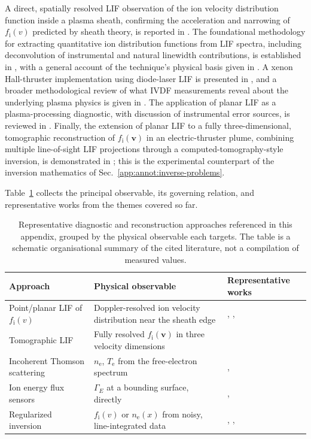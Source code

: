 A direct, spatially resolved LIF observation of the ion velocity distribution function inside a plasma sheath, confirming the acceleration and narrowing of $f_{\mathrm{i}}(v)$ predicted by sheath theory, is reported in \cite{ref0329}. The foundational methodology for extracting quantitative ion distribution functions from LIF spectra, including deconvolution of instrumental and natural linewidth contributions, is established in \cite{ref0338}, with a general account of the technique's physical basis given in \cite{ref0300}. A xenon Hall-thruster implementation using diode-laser LIF is presented in \cite{ref0322}, and a broader methodological review of what IVDF measurements reveal about the underlying plasma physics is given in \cite{ref0347}. The application of planar LIF as a plasma-processing diagnostic, with discussion of instrumental error sources, is reviewed in \cite{ref0304}. Finally, the extension of planar LIF to a fully three-dimensional, tomographic reconstruction of $f_{\mathrm{i}}(\mathbf{v})$ in an electric-thruster plume, combining multiple line-of-sight LIF projections through a computed-tomography-style inversion, is demonstrated in \cite{ref0328}; this is the experimental counterpart of the inversion mathematics of Sec.~\ref{app:annot:inverse-problems}.

Table~\ref{tab:annot:diagnostics} collects the principal observable, its governing relation, and representative works from the themes covered so far.

\begin{table}[htbp]
\centering
\caption{Representative diagnostic and reconstruction approaches referenced in this appendix, grouped by the physical observable each targets. The table is a schematic organisational summary of the cited literature, not a compilation of measured values.}
\label{tab:annot:diagnostics}
\begin{tabularx}{\textwidth}{@{}l X l@{}}
\toprule
Approach & Physical observable & Representative works \\
\midrule
Point/planar LIF of $f_{\mathrm{i}}(v)$ & Doppler-resolved ion velocity distribution near the sheath edge & \cite{ref0329}, \cite{ref0338}, \cite{ref0322} \\
Tomographic LIF & Fully resolved $f_{\mathrm{i}}(\mathbf{v})$ in three velocity dimensions & \cite{ref0328} \\
Incoherent Thomson scattering & $n_{\mathrm{e}}$, $T_{\mathrm{e}}$ from the free-electron spectrum & \cite{ref0384}, \cite{ref0355} \\
Ion energy flux sensors & $\Gamma_{E}$ at a bounding surface, directly & \cite{ref0074}, \cite{ref0075} \\
Regularized inversion & $f_{\mathrm{i}}(v)$ or $n_{\mathrm{e}}(x)$ from noisy, line-integrated data & \cite{ref0677}, \cite{ref0683}, \cite{ref0692} \\
\bottomrule
\end{tabularx}
\end{table}

